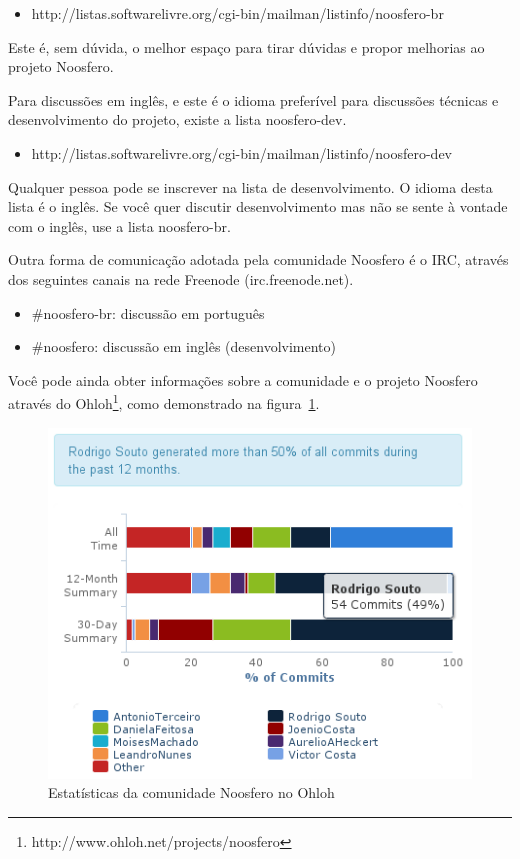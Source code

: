 \documentclass[11pt]{article}
\begin{document}
\begin{itemize}
  \item http://listas.softwarelivre.org/cgi-bin/mailman/listinfo/noosfero-br
\end{itemize}

Este é, sem dúvida, o melhor espaço para tirar dúvidas e propor melhorias
ao projeto Noosfero.

Para discussões em inglês, e este é o idioma preferível para discussões
técnicas e desenvolvimento do projeto, existe a lista noosfero-dev.

\begin{itemize}
  \item http://listas.softwarelivre.org/cgi-bin/mailman/listinfo/noosfero-dev
\end{itemize}

Qualquer pessoa pode se inscrever na lista de desenvolvimento.  O idioma desta
lista é o inglês. Se você quer discutir desenvolvimento mas não se sente à
vontade com o inglês, use a lista noosfero-br.

Outra forma de comunicação adotada pela comunidade Noosfero
é o IRC, através dos seguintes canais na rede Freenode (irc.freenode.net).

\begin{itemize}
  \item \#noosfero-br: discussão em português
  \item \#noosfero: discussão em inglês (desenvolvimento)
\end{itemize}

Você pode ainda obter informações sobre a comunidade e o projeto Noosfero
através do Ohloh\footnote{http://www.ohloh.net/projects/noosfero}, como
demonstrado na figura~\ref{fig:noosfero-ohloh}.

\begin{figure}[h]
\center
\includegraphics[scale=0.5]{noosfero-ohloh.png}
\caption{Estatísticas da comunidade Noosfero no Ohloh}
\label{fig:noosfero-ohloh}
\end{figure}
\end{document}
